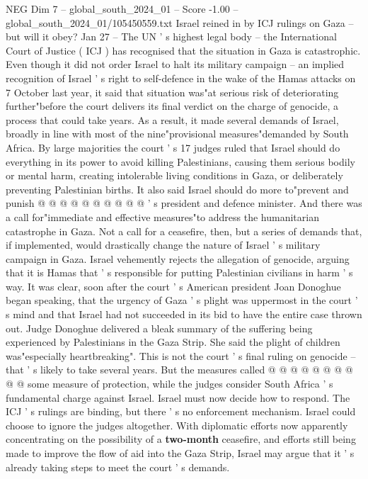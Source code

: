 \begin{textsample}{NEG Dim 7 – global\_south\_2024\_01 – Score -1.00 – global\_south\_2024\_01/105450559.txt}  \label{ex:f7_neg_143}
Israel reined in by ICJ rulings on Gaza -- but will it obey?
Jan 27 -- The UN ' s highest legal body -- the International Court of Justice ( ICJ ) has recognised that the situation in Gaza is catastrophic.
Even though it did not order Israel to halt its military campaign -- an implied recognition of Israel ' s right to self-defence in the wake of the Hamas attacks on 7 October last year, it said that situation was"at serious risk of deteriorating further"before the court delivers its final verdict on the charge of genocide, a process that could take years.
As a result, it made several demands of Israel, broadly in line with most of the nine"provisional measures"demanded by South Africa.
By large majorities the court ' s 17 judges ruled that Israel should do everything in its power to avoid killing Palestinians, causing them serious bodily or mental harm, creating intolerable living conditions in Gaza, or deliberately preventing Palestinian births.
It also said Israel should do more to"prevent and punish @ @ @ @ @ @ @ @ @ @ ' s president and defence minister.
And there was a call for"immediate and effective measures"to address the humanitarian catastrophe in Gaza.
Not a call for a ceasefire, then, but a series of demands that, if implemented, would drastically change the nature of Israel ' s military campaign in Gaza.
Israel vehemently rejects the allegation of genocide, arguing that it is Hamas that ' s responsible for putting Palestinian civilians in harm ' s way.
It was clear, soon after the court ' s American president Joan Donoghue began speaking, that the urgency of Gaza ' s plight was uppermost in the court ' s mind and that Israel had not succeeded in its bid to have the entire case thrown out.
Judge Donoghue delivered a bleak summary of the suffering being experienced by Palestinians in the Gaza Strip.
She said the plight of children was"especially heartbreaking".
This is not the court ' s final ruling on genocide -- that ' s likely to take several years.
But the measures called @ @ @ @ @ @ @ @ @ @ some measure of protection, while the judges consider South Africa ' s fundamental charge against Israel.
Israel must now decide how to respond.
The ICJ ' s rulings are binding, but there ' s no enforcement mechanism.
Israel could choose to ignore the judges altogether.
With diplomatic efforts now apparently concentrating on the possibility of a \textbf{two-month} ceasefire, and efforts still being made to improve the flow of aid into the Gaza Strip, Israel may argue that it ' s already taking steps to meet the court ' s demands.

\end{textsample}

